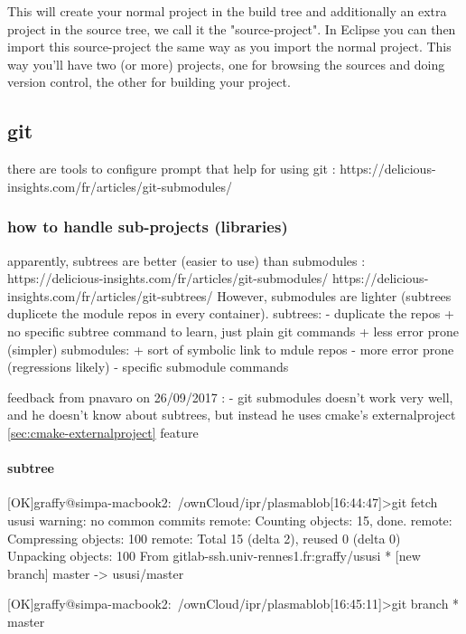 \documentclass[a4paper]{report}
\begin{document}
			This will create your normal project in the build tree and additionally an extra project in the source tree, we call it the "source-project". In Eclipse you can then import this source-project the same way as you import the normal project. This way you'll have two (or more) projects, one for browsing the sources and doing version control, the other for building your project. 		
		
		
	\subsection{git}
		
		there are tools to configure prompt that help for using git : https://delicious-insights.com/fr/articles/git-submodules/

		\subsubsection{how to handle sub-projects (libraries)}

			apparently, subtrees are better (easier to use) than submodules :
				https://delicious-insights.com/fr/articles/git-submodules/
				https://delicious-insights.com/fr/articles/git-subtrees/
			However, submodules are lighter (subtrees duplicete the module repos in every container).  
			subtrees:
				- duplicate the repos
				+ no specific subtree command to learn, just plain git commands
				+ less error prone (simpler)
			submodules:
				+ sort of symbolic link to mdule repos
				- more error prone (regressions likely)
				- specific submodule commands

			feedback from pnavaro on 26/09/2017 :
				- git submodules doesn't work very well, and he doesn't know about subtrees, but instead he uses cmake's externalproject \ref{sec:cmake-externalproject} feature

			\paragraph{subtree}		
				[OK]graffy@simpa-macbook2:~/ownCloud/ipr/plasmablob[16:44:47]>git fetch ususi
				warning: no common commits
				remote: Counting objects: 15, done.
				remote: Compressing objects: 100%
				remote: Total 15 (delta 2), reused 0 (delta 0)
				Unpacking objects: 100%
				From gitlab-ssh.univ-rennes1.fr:graffy/ususi
				 * [new branch]      master     -> ususi/master

				[OK]graffy@simpa-macbook2:~/ownCloud/ipr/plasmablob[16:45:11]>git branch
				* master
\end{document}
